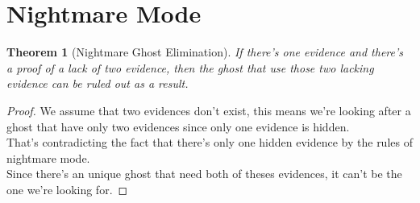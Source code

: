 \documentclass[12pt, letterpaper]{article}
\newtheorem{theorem}{Theorem}
\begin{document}
    \section{Nightmare Mode}

    \begin{theorem}[Nightmare Ghost Elimination]
        If there's one evidence and there's a proof of a lack of two evidence, then the ghost that use those two lacking evidence can be ruled out as a result.
    \end{theorem}
    \begin{proof}
        We assume that two evidences don't exist, this means we're looking after a ghost that have only two evidences since only one evidence is hidden.\\
        That's contradicting the fact that there's only one hidden evidence by the rules of nightmare mode.\\
        Since there's an unique ghost that need both of theses evidences, it can't be the one we're looking for.
    \end{proof}
\end{document}
